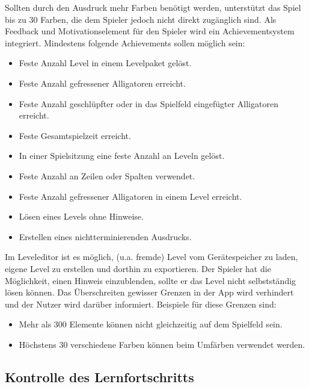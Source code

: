 \begin{requirements}
	Sollten durch den Ausdruck mehr Farben benötigt werden, unterstützt das Spiel bis zu 30 Farben, die dem Spieler jedoch nicht direkt zugänglich sind.
	Als Feedback und Motivationselement für den Spieler wird ein Achievementsystem integriert.
	Mindestens folgende Achievements sollen möglich sein:
		\begin{itemize}
			\item Feste Anzahl Level in einem Levelpaket gelöst.
			\item Feste Anzahl gefressener Alligatoren erreicht.
			\item Feste Anzahl geschlüpfter oder in das Spielfeld eingefügter Alligatoren erreicht.
			\item Feste Gesamtspielzeit erreicht.
			\item In einer Spielsitzung eine feste Anzahl an Leveln gelöst.
			\item Feste Anzahl an Zeilen oder Spalten verwendet.
			\item Feste Anzahl gefressener Alligatoren in einem Level erreicht.
			\item Lösen eines Levels ohne Hinweise.
			\item Erstellen eines nichtterminierenden Ausdrucks.
		\end{itemize}
	Im Leveleditor ist es möglich, (u.a. fremde) Level vom Gerätespeicher zu laden, eigene Level zu erstellen und dorthin zu exportieren.
	 Der Spieler hat die Möglichkeit, einen Hinweis einzublenden, sollte er das Level nicht selbstständig lösen können.
	 Das Überschreiten gewisser Grenzen in der App wird verhindert und der Nutzer wird darüber informiert.
	Beispiele für diese Grenzen sind:
	\begin{itemize}
		\item Mehr als 300 Elemente können nicht gleichzeitig auf dem Spielfeld sein.
		\item Höchstens 30 verschiedene Farben können beim Umfärben verwendet werden.
	\end{itemize}
\end{requirements}


\subsection{Kontrolle des Lernfortschritts}

